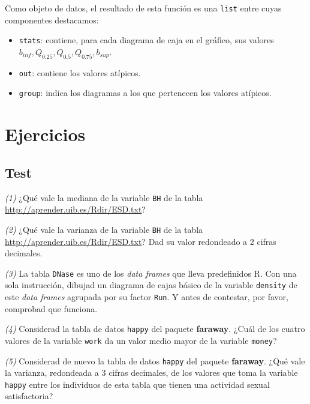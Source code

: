 \documentclass[]{book}
\theoremstyle{definition}
\theoremstyle{definition}
\theoremstyle{definition}
\theoremstyle{remark}
\begin{document}
\begin{itemize}
  Como objeto de datos, el resultado de esta función es una \texttt{list} entre cuyas componentes destacamos:

  \begin{itemize}
  \item
    \texttt{stats}: contiene, para cada diagrama de caja en el gráfico, sus valores
    \(b_{inf}, Q_{0.25}, Q_{0.5}, Q_{0.75}, b_{sup}\).
  \item
    \texttt{out}: contiene los valores atípicos.
  \item
    \texttt{group}: indica los diagramas a los que pertenecen los valores atípicos.
  \end{itemize}
\end{itemize}

\hypertarget{ejercicios-10}{%
\section{Ejercicios}\label{ejercicios-10}}

\hypertarget{test-9}{%
\subsection*{Test}\label{test-9}}

\emph{(1)} ¿Qué vale la mediana de la variable \texttt{BH} de la tabla \url{http://aprender.uib.es/Rdir/ESD.txt}?

\emph{(2)} ¿Qué vale la varianza de la variable \texttt{BH} de la tabla \url{http://aprender.uib.es/Rdir/ESD.txt}? Dad su valor redondeado a 2 cifras decimales.

\emph{(3)} La tabla \texttt{DNase} es uno de los \emph{data frames} que lleva predefinidos R. Con una sola instrucción, dibujad un diagrama de cajas básico de la variable \texttt{density} de este \emph{data frames} agrupada por su factor \texttt{Run}. Y antes de contestar, por favor, comprobad que funciona.

\emph{(4)} Considerad la tabla de datos \texttt{happy} del paquete \textbf{faraway}. ¿Cuál de los cuatro valores de la variable \texttt{work} da un valor medio mayor de la variable \texttt{money}?

\emph{(5)} Considerad de nuevo la tabla de datos \texttt{happy} del paquete \textbf{faraway}. ¿Qué vale la varianza, redondeada a 3 cifras decimales, de los valores que toma la variable \texttt{happy} entre los individuos de esta tabla que tienen una actividad sexual satisfactoria?
\end{document}
